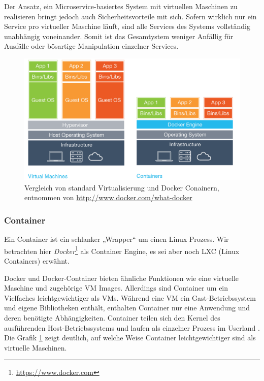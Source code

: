 Der Ansatz, ein Microservice-basiertes System mit virtuellen Maschinen zu realisieren bringt jedoch auch Sicherheitsvorteile mit sich. Sofern wirklich nur ein Service pro virtueller Maschine läuft, sind alle Services des Systems vollständig unabhängig voneinander. Somit ist das Gesamtystem weniger Anfällig für Ausfälle oder bösartige Manipulation einzelner Services.

\begin{figure}[h]
    \centering
    \includegraphics[scale=0.3]{img/container-vm.pdf}
    \caption{Vergleich von standard Virtualisierung und Docker Conainern, entnommen von \url{http://www.docker.com/what-docker}}
    \label{fig:container-vm}
\end{figure}

\subsubsection{Container}
Ein Container ist ein schlanker „Wrapper“ um einen Linux Prozess. Wir betrachten hier \textit{Docker}\footnote{\url{https://www.docker.com}} als Container Engine, es sei aber noch LXC (Linux Containers) erwähnt.

Docker und Docker-Container bieten ähnliche Funktionen wie eine virtuelle Maschine und zugehörige VM Images. Allerdings sind Container um ein Vielfaches leichtgewichtiger als VMs. Während eine VM ein Gast-Betriebssystem und eigene Bibliotheken enthält, enthalten Container nur eine Anwendung und deren benötigte Abhängigkeiten. Container teilen sich den Kernel des ausführenden Host-Betriebssystems und laufen als einzelner Prozess im Userland \cite{newman2015}. Die Grafik \ref{fig:container-vm} zeigt deutlich, auf welche Weise Container leichtgewichtiger sind als virtuelle Maschinen.

